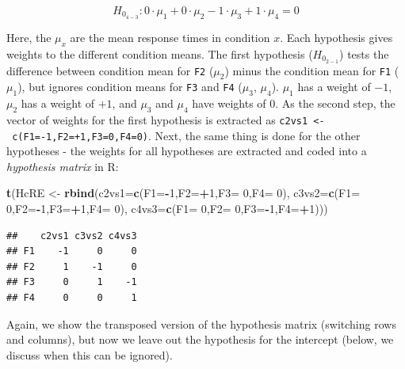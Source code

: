 \documentclass[12pt,]{krantz}
\newenvironment{Shaded}{\begin{snugshade}}{\end{snugshade}}
\newcommand{\DataTypeTok}[1]{\textcolor[rgb]{0.13,0.29,0.53}{#1}}
\newcommand{\DecValTok}[1]{\textcolor[rgb]{0.00,0.00,0.81}{#1}}
\newcommand{\KeywordTok}[1]{\textcolor[rgb]{0.13,0.29,0.53}{\textbf{#1}}}
\newcommand{\NormalTok}[1]{#1}
\newcommand{\OperatorTok}[1]{\textcolor[rgb]{0.81,0.36,0.00}{\textbf{#1}}}
\newcommand{\StringTok}[1]{\textcolor[rgb]{0.31,0.60,0.02}{#1}}
\begin{document}
\begin{equation}
H_{0_{4-3}}: 0 \cdot \mu_1 + 0 \cdot \mu_2 - 1 \cdot \mu_3 + 1 \cdot \mu_4 = 0
\end{equation}

Here, the \(\mu_x\) are the mean response times in condition \(x\). Each hypothesis gives weights to the different condition means. The first hypothesis (\(H_{0_{2-1}}\)) tests the difference between condition mean for \texttt{F2} (\(\mu_2\)) minus the condition mean for \texttt{F1} (\(\mu_1\)), but ignores condition means for \texttt{F3} and \texttt{F4} (\(\mu_3\), \(\mu_4\)). \(\mu_1\) has a weight of \(-1\), \(\mu_2\) has a weight of \(+1\), and \(\mu_3\) and \(\mu_4\) have weights of \(0\). As the second step, the vector of weights for the first hypothesis is extracted as \texttt{c2vs1\ \textless{}-\ c(F1=-1,F2=+1,F3=0,F4=0)}. Next, the same thing is done for the other hypotheses - the weights for all hypotheses are extracted and coded into a \emph{hypothesis matrix} in R:

\begin{Shaded}
\begin{Highlighting}[]
\KeywordTok{t}\NormalTok{(HcRE <-}\StringTok{ }\KeywordTok{rbind}\NormalTok{(}\DataTypeTok{c2vs1=}\KeywordTok{c}\NormalTok{(}\DataTypeTok{F1=}\OperatorTok{-}\DecValTok{1}\NormalTok{,}\DataTypeTok{F2=}\OperatorTok{+}\DecValTok{1}\NormalTok{,}\DataTypeTok{F3=} \DecValTok{0}\NormalTok{,}\DataTypeTok{F4=} \DecValTok{0}\NormalTok{),}
                \DataTypeTok{c3vs2=}\KeywordTok{c}\NormalTok{(}\DataTypeTok{F1=} \DecValTok{0}\NormalTok{,}\DataTypeTok{F2=}\OperatorTok{-}\DecValTok{1}\NormalTok{,}\DataTypeTok{F3=}\OperatorTok{+}\DecValTok{1}\NormalTok{,}\DataTypeTok{F4=} \DecValTok{0}\NormalTok{),}
                \DataTypeTok{c4vs3=}\KeywordTok{c}\NormalTok{(}\DataTypeTok{F1=} \DecValTok{0}\NormalTok{,}\DataTypeTok{F2=} \DecValTok{0}\NormalTok{,}\DataTypeTok{F3=}\OperatorTok{-}\DecValTok{1}\NormalTok{,}\DataTypeTok{F4=}\OperatorTok{+}\DecValTok{1}\NormalTok{)))}
\end{Highlighting}
\end{Shaded}

\begin{verbatim}
##    c2vs1 c3vs2 c4vs3
## F1    -1     0     0
## F2     1    -1     0
## F3     0     1    -1
## F4     0     0     1
\end{verbatim}

Again, we show the transposed version of the hypothesis matrix (switching rows and columns), but now we leave out the hypothesis for the intercept (below, we discuss when this can be ignored).
\end{document}
